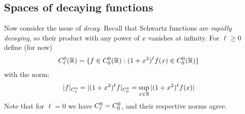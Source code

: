     \subsection{Spaces of decaying functions}
      \label{sec:decayfunc}
      Now consider the issue of \emph{decay}.
      Recall that Schwartz functions are \emph{rapidly decaying}, so their product with any power of $x$ vanishes at infinity.
      For $\ell\ge0$ define (for now)
      \begin{align*}
        {C^0_\ell}(\mathbb{R}) = \{f\in {C^0_0}(\mathbb{R}):(1+x^2)^\ell f(x)\in {C^0_0}(\mathbb{R})\}
      \end{align*}
      with the norm:
      \begin{align*}
        |f|_{C^0_\ell} = |(1+x^2)^\ell f|_{{C^0_0}} = \sup_{x\in\mathbb{R}} |(1+x^2)^\ell f(x)|
      \end{align*}
      Note that for $\ell=0$ we have ${C^0_\ell}={C^0_0}$, and their respective norms agree.

